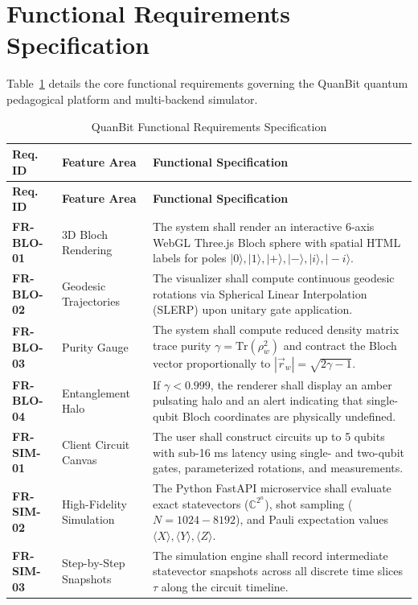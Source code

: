 \documentclass[11pt, a4paper]{article}
\begin{document}
\section{Functional Requirements Specification}

Table~\ref{tab:functional_requirements} details the core functional requirements governing the QuanBit quantum pedagogical platform and multi-backend simulator.

\begingroup
\small
\setlength{\tabcolsep}{4pt}
\begin{longtable}{@{}p{2.1cm}p{3.2cm}p{9.8cm}@{}}
\caption{QuanBit Functional Requirements Specification} \label{tab:functional_requirements} \\
\toprule
\textbf{Req. ID} & \textbf{Feature Area} & \textbf{Functional Specification} \\
\midrule
\endfirsthead
\toprule
\textbf{Req. ID} & \textbf{Feature Area} & \textbf{Functional Specification} \\
\midrule
\endhead
\bottomrule
\endfoot
\textbf{FR-BLO-01} & 3D Bloch Rendering & The system shall render an interactive 6-axis WebGL Three.js Bloch sphere with spatial HTML labels for poles $|0\rangle, |1\rangle, |+\rangle, |-\rangle, |i\rangle, |-i\rangle$. \\
\textbf{FR-BLO-02} & Geodesic Trajectories & The visualizer shall compute continuous geodesic rotations via Spherical Linear Interpolation (SLERP) upon unitary gate application. \\
\textbf{FR-BLO-03} & Purity Gauge & The system shall compute reduced density matrix trace purity $\gamma = \text{Tr}(\rho_w^2)$ and contract the Bloch vector proportionally to $|\vec{r}_w| = \sqrt{2\gamma - 1}$. \\
\textbf{FR-BLO-04} & Entanglement Halo & If $\gamma < 0.999$, the renderer shall display an amber pulsating halo and an alert indicating that single-qubit Bloch coordinates are physically undefined. \\
\textbf{FR-SIM-01} & Client Circuit Canvas & The user shall construct circuits up to 5 qubits with sub-16 ms latency using single- and two-qubit gates, parameterized rotations, and measurements. \\
\textbf{FR-SIM-02} & High-Fidelity Simulation & The Python FastAPI microservice shall evaluate exact statevectors ($\mathbb{C}^{2^n}$), shot sampling ($N=1024-8192$), and Pauli expectation values $\langle X \rangle, \langle Y \rangle, \langle Z \rangle$. \\
\textbf{FR-SIM-03} & Step-by-Step Snapshots & The simulation engine shall record intermediate statevector snapshots across all discrete time slices $\tau$ along the circuit timeline. \\

\end{longtable}
\end{document}
